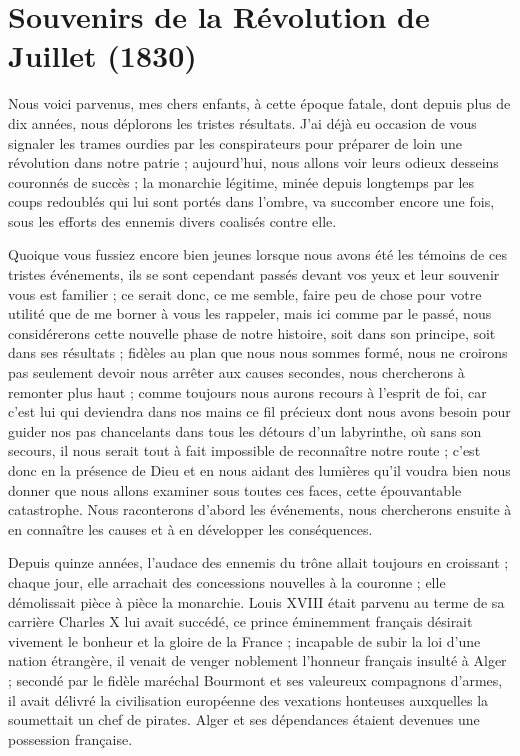 \documentclass[11pt,a4paper]{report}
\begin{document}
\chapter{Souvenirs de la Révolution de Juillet (1830)}

Nous voici parvenus, mes chers enfants, à cette époque fatale, dont depuis plus de dix années, nous déplorons les tristes résultats. J'ai déjà eu occasion de vous signaler les trames ourdies par les conspirateurs pour préparer de loin une révolution dans notre patrie ; aujourd'hui, nous allons voir leurs odieux desseins couronnés de succès ; la monarchie légitime, minée depuis longtemps par les coups redoublés qui lui sont portés dans l'ombre, va succomber encore une fois, sous les efforts des ennemis divers coalisés contre elle.

Quoique vous fussiez encore bien jeunes lorsque nous avons été les témoins de ces tristes événements, ils se sont cependant passés devant vos yeux et leur souvenir vous est familier ; ce serait donc, ce me semble, faire peu de chose pour votre utilité que de me borner à vous les rappeler, mais ici comme par le passé, nous considérerons cette nouvelle phase de notre histoire, soit dans son principe, soit dans ses résultats ; fidèles au plan que nous nous sommes formé, nous ne croirons pas seulement devoir nous arrêter aux causes secondes, nous chercherons à remonter plus haut ; comme toujours nous aurons recours à l'esprit de foi, car c'est lui qui deviendra dans nos mains ce fil précieux dont nous avons besoin pour guider nos pas chancelants dans tous les détours d'un labyrinthe, où sans son secours, il nous serait tout à fait impossible de reconnaître notre route ; c'est donc en la présence de Dieu et en nous aidant des lumières qu'il voudra bien nous donner que nous allons examiner sous toutes ces faces, cette épouvantable catastrophe. Nous raconterons d'abord les événements, nous chercherons ensuite à en connaître les causes et à en développer les conséquences.

Depuis quinze années, l'audace des ennemis du trône allait toujours en croissant ; chaque jour, elle arrachait des concessions nouvelles à la couronne ; elle démolissait pièce à pièce la monarchie. Louis XVIII était parvenu au terme de sa carrière Charles X lui avait succédé, ce prince éminemment français désirait vivement le bonheur et la gloire de la France ; incapable de subir la loi d'une nation étrangère, il venait de venger noblement l'honneur français insulté à Alger ; secondé par le fidèle maréchal Bourmont et ses valeureux compagnons d'armes, il avait délivré la civilisation européenne des vexations honteuses auxquelles la soumettait un chef de pirates. Alger et ses dépendances étaient devenues une possession française.
\end{document}
